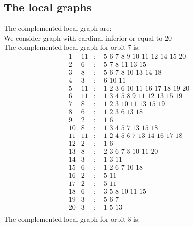 \documentclass[12pt]{article}
\begin{document}
\subsection{The local graphs}
The complemented local graph are:\\
We consider graph with cardinal inferior or equal to $20$\\
The complemented local graph for orbit $7$ is:
\begin{equation*}
\begin{array}{rrcl}
1&11&:&\,\,5\,\,6\,\,7\,\,8\,\,9\,\,10\,\,11\,\,12\,\,14\,\,15\,\,20\\
2&6&:&\,\,5\,\,7\,\,8\,\,11\,\,13\,\,15\\
3&8&:&\,\,5\,\,6\,\,7\,\,8\,\,10\,\,13\,\,14\,\,18\\
4&3&:&\,\,6\,\,10\,\,11\\
5&11&:&\,\,1\,\,2\,\,3\,\,6\,\,10\,\,11\,\,16\,\,17\,\,18\,\,19\,\,20\\
6&11&:&\,\,1\,\,3\,\,4\,\,5\,\,8\,\,9\,\,11\,\,12\,\,13\,\,15\,\,19\\
7&8&:&\,\,1\,\,2\,\,3\,\,10\,\,11\,\,13\,\,15\,\,19\\
8&6&:&\,\,1\,\,2\,\,3\,\,6\,\,13\,\,18\\
9&2&:&\,\,1\,\,6\\
10&8&:&\,\,1\,\,3\,\,4\,\,5\,\,7\,\,13\,\,15\,\,18\\
11&11&:&\,\,1\,\,2\,\,4\,\,5\,\,6\,\,7\,\,13\,\,14\,\,16\,\,17\,\,18\\
12&2&:&\,\,1\,\,6\\
13&8&:&\,\,2\,\,3\,\,6\,\,7\,\,8\,\,10\,\,11\,\,20\\
14&3&:&\,\,1\,\,3\,\,11\\
15&6&:&\,\,1\,\,2\,\,6\,\,7\,\,10\,\,18\\
16&2&:&\,\,5\,\,11\\
17&2&:&\,\,5\,\,11\\
18&6&:&\,\,3\,\,5\,\,8\,\,10\,\,11\,\,15\\
19&3&:&\,\,5\,\,6\,\,7\\
20&3&:&\,\,1\,\,5\,\,13\\
\end{array}
\end{equation*}
The complemented local graph for orbit $8$ is:
\end{document}
